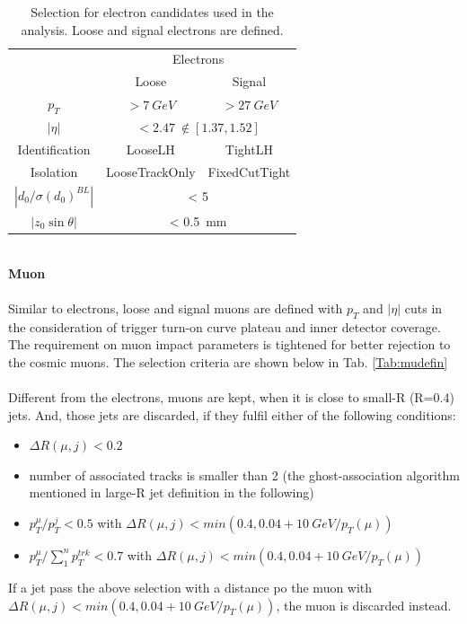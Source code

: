 \begin{table}[htb]
	\caption{Selection for electron candidates used in the analysis. Loose and signal electrons are defined. }\label{Tab:eledefin}
	\centering
	\begin{tabular}{|c||c|c|}
		\hline
		& \multicolumn{2}{c|}{ Electrons}\\
		\cline{2-3}
		&   Loose & Signal \\
		\hline
		$p_T$ & $>7~GeV$ & $>27~GeV$  \\
		\hline
		$| \eta |$ &  \multicolumn{2}{c|}{ $< 2.47 ~ \notin [1.37,1.52]$ } \\
		\hline
		Identification & LooseLH & TightLH   \\
		\hline
		Isolation       &   LooseTrackOnly & FixedCutTight  \\
		\hline
		$|d_0/\sigma(d_0)^{BL}|$ &   \multicolumn{2}{|c|}{  < 5}  \\
		\hline
		$|z_0\sin\theta| $  & \multicolumn{2}{|c|}{< 0.5~mm}  \\
		\hline
	\end{tabular}
\end{table}
\noindent
\\{\bf Muon}
\\
\\Similar to electrons, loose and signal muons are defined with $p_{T}$ and $|\eta|$ cuts in the consideration of trigger turn-on curve plateau and inner detector coverage. The requirement on muon impact parameters is tightened for better rejection to the cosmic muons. The selection criteria are shown below in Tab. \ref{Tab:mudefin}
\\
\\Different from the electrons, muons are kept, when it is close to small-R (R=0.4) jets. And, those jets are discarded, if they fulfil either of the following conditions:
\begin{itemize}
  \item $\Delta R(\mu,j)<0.2$
  \item number of associated tracks is smaller than 2 (the ghost-association algorithm mentioned in large-R jet definition in the following)
  \item $p_{T}^{\mu}/p_{T}^j<0.5$ with $\Delta R(\mu,j)<min(0.4,0.04+10~GeV/p_{T}(\mu))$
  \item $p_{T}^{\mu}/\sum^{n}_{1} p_{T}^{trk}<0.7$ with $\Delta R(\mu,j)<min(0.4,0.04+10~GeV/p_{T}(\mu))$
\end{itemize}
\noindent
If a jet pass the above selection with a distance po the muon with $\Delta R(\mu,j)<min(0.4,0.04+10~GeV/p_{T}(\mu))$, the muon is discarded instead.  
